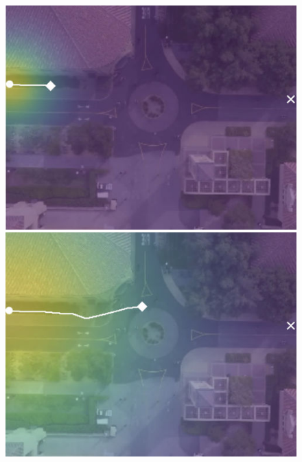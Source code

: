 \documentclass[letterpaper,10pt,conference]{ieeeconf}
\begin{document}
\begin{figure}
	\vspace{0.1cm}
	\begin{minipage}[c]{0.5cm}
	\end{minipage}
	\begin{minipage}[c]{0.3\linewidth}
		\includegraphics[width=\linewidth]{./figures/comparison/rand_death_1_2_t=70.jpg}
	\end{minipage}
	\begin{minipage}[c]{0.3\linewidth}
		\includegraphics[width=\linewidth]{./figures/comparison/rand_death_1_2_t=250.jpg}
	\end{minipage}
	\begin{minipage}[c]{0.3\linewidth}

\end{minipage}
\end{figure}
\end{document}
